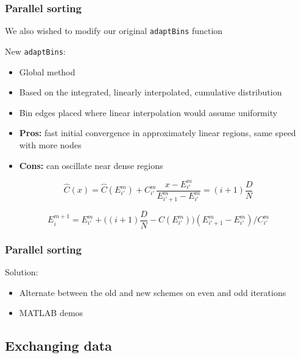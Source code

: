 \documentclass[usernames,dvipsnames]{beamer}
\begin{document}
\begin{frame}
	\frametitle{Parallel sorting}
	
	We also wished to modify our original \texttt{adaptBins} function
	
	
	\begin{block}{New \texttt{adaptBins}:}
		\begin{itemize}
			\item Global method
			\item Based on the integrated, linearly interpolated, cumulative distribution
			\item Bin edges placed where linear interpolation would assume uniformity
			\item \textbf{Pros:} fast initial convergence in approximately linear regions, same speed with more nodes
			\item \textbf{Cons:} can oscillate near dense regions
		\end{itemize}
	\end{block}
	
	\vspace{-5pt}
	
	\begin{equation}
		\hat C(x) = \hat C(E^m_{i'}) + C^m_{i'} \dfrac{x - E^m_{i'}}{E^m_{{i'}+1} - E^m_{i'}} = (i+1) \dfrac{D}{N}
	\end{equation}
	
	\begin{equation}
		E^{m+1}_i = E^m_{i'} + \Big( (i+1) \dfrac{D}{N} - C(E^m_{i'}) \Big) (E^m_{{i'}+1} - E^m_{i'}) / C^m_{i'}
	\end{equation}
	
\end{frame}

\begin{frame}
	\frametitle{Parallel sorting}
	
	\begin{block}{Solution:}
		\begin{itemize}
			\item Alternate between the old and new schemes on even and odd iterations
			\item MATLAB demos
		\end{itemize}
	\end{block}
	
\end{frame}


\subsection{Exchanging data}
\end{document}

